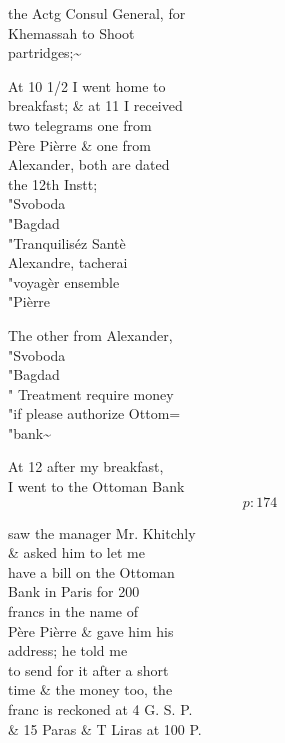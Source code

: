 \documentclass{report}
\begin{document}


	\par{
 	the Actg Consul General, for\ \\Khemassah to Shoot\ \\partridges;\~{}\ \\
	}

	\par{
 	At 10 1/2 I went home to\ \\breakfast; \& at 11 I received\ \\two telegrams one from\ \\Père Pièrre \& one from\ \\Alexander, both are dated\ \\the 12th Instt;\ \\"Svoboda\ \\"Bagdad\ \\"Tranquiliséz Santè\ \\Alexandre, tacherai\ \\"voyagèr ensemble\ \\"Pièrre\ \\
	}

	\par{
 	The other from Alexander,\ \\"Svoboda\ \\"Bagdad\ \\" Treatment require money\ \\"if please authorize Ottom=\ \\"bank\~{}\ \\
	}

	\par{
 	At 12 after my breakfast,\ \\I went to the Ottoman Bank\ \\
  \[p: 174 \]

	}


	\par{
 	saw the manager Mr. Khitchly\ \\\& asked him to let me\ \\have a bill on the Ottoman\ \\Bank in Paris for 200\ \\francs in the name of\ \\Père Pièrre \& gave him his\ \\address; he told me\ \\to send for it after a short\ \\time \& the money too, the\ \\franc is reckoned at 4 G. S. P.\ \\\& 15 Paras \& T Liras at 100 P.\ \\
	}
\end{document}

